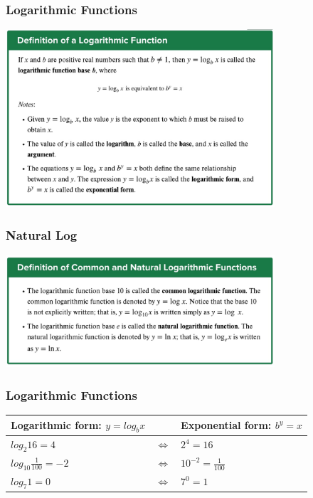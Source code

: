 \documentclass{beamer}
\begin{document}
\begin{frame}\frametitle{Logarithmic Functions}

\begin{center}
\includegraphics[width=10cm]{fig/log1.jpg}
\end{center}

\end{frame}

\begin{frame}\frametitle{Natural Log}

\begin{center}
\includegraphics[width=10cm]{fig/logln.jpg}
\end{center}

\end{frame}

\begin{frame}\frametitle{Logarithmic Functions}

\begin{table}[H]
    \centering
    
  \begin{tabular}{|l|c|l|}
    \hline \hline
	Logarithmic form: $y =log_b x$ & & Exponential form: $b^y = x$ \\
   \hline  $log_2 16 = 4$ & $\Longleftrightarrow$ & $2^4 = 16$ \\
   \hline  $log_10 \frac{1}{100} = -2$ & $\Longleftrightarrow$ & $10^{-2} = \frac{1}{100}$ \\
   \hline  $log_7 1 = 0$ & $\Longleftrightarrow$ & $7^0 = 1$ \\
\hline \hline
  \end{tabular}
\end{table}

\end{frame}
\end{document}
